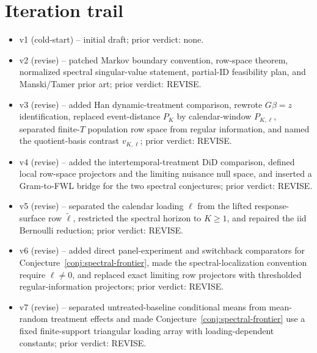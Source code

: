 \documentclass[11pt]{article}
\theoremstyle{definition}
\theoremstyle{plain}
\theoremstyle{remark}
\begin{document}
\section{Iteration trail}
\begin{itemize}[leftmargin=*]
\item v1 (cold-start) -- initial draft; prior verdict: none.
\item v2 (revise) -- patched Markov boundary convention, row-space theorem, normalized spectral singular-value statement, partial-ID feasibility plan, and Manski/Tamer prior art; prior verdict: REVISE.
\item v3 (revise) -- added Han dynamic-treatment comparison, rewrote \(G\beta=z\) identification, replaced event-distance \(P_K\) by calendar-window \(P_{K,\ell}\), separated finite-\(T\) population row space from regular information, and named the quotient-basis contrast \(v_{K,\ell}\); prior verdict: REVISE.
\item v4 (revise) -- added the intertemporal-treatment DiD comparison, defined local row-space projectors and the limiting nuisance null space, and inserted a Gram-to-FWL bridge for the two spectral conjectures; prior verdict: REVISE.
\item v5 (revise) -- separated the calendar loading \(\ell\) from the lifted response-surface row \(\widetilde\ell\), restricted the spectral horizon to \(K\ge1\), and repaired the iid Bernoulli reduction; prior verdict: REVISE.
\item v6 (revise) -- added direct panel-experiment and switchback comparators for Conjecture~\ref{conj:spectral-frontier}, made the spectral-localization convention require \(\ell\ne0\), and replaced exact limiting row projectors with thresholded regular-information projectors; prior verdict: REVISE.
\item v7 (revise) -- separated untreated-baseline conditional means from mean-random treatment effects and made Conjecture~\ref{conj:spectral-frontier} use a fixed finite-support triangular loading array with loading-dependent constants; prior verdict: REVISE.
\end{itemize}
\end{document}
